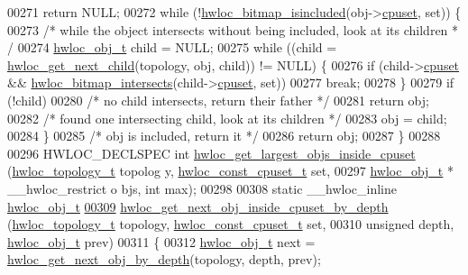 \begin{DoxyCode}
00271     \textcolor{keywordflow}{return} NULL;
00272   \textcolor{keywordflow}{while} (!\hyperlink{a00065_gaae29e14a926c198e8f91e6e4790621e7}{hwloc_bitmap_isincluded}(obj->\hyperlink{a00016_a67925e0f2c47f50408fbdb9bddd0790f}{cpuset}, \textcolor{keyword}{set})) \{
00273     \textcolor{comment}{/* while the object intersects without being included, look at its children *
      /}
00274     \hyperlink{a00016}{hwloc_obj_t} child = NULL;
00275     \textcolor{keywordflow}{while} ((child = \hyperlink{a00053_gae5ef1af636849f77714e1584ba78cf9c}{hwloc_get_next_child}(topology, obj, child)) != NULL) \{
00276       \textcolor{keywordflow}{if} (child->\hyperlink{a00016_a67925e0f2c47f50408fbdb9bddd0790f}{cpuset} && \hyperlink{a00065_ga575c27953709a8cb9a047aae65157526}{hwloc_bitmap_intersects}(child->\hyperlink{a00016_a67925e0f2c47f50408fbdb9bddd0790f}{cpuset}, \textcolor{keyword}{set}))
00277         \textcolor{keywordflow}{break};
00278     \}
00279     \textcolor{keywordflow}{if} (!child)
00280       \textcolor{comment}{/* no child intersects, return their father */}
00281       \textcolor{keywordflow}{return} obj;
00282     \textcolor{comment}{/* found one intersecting child, look at its children */}
00283     obj = child;
00284   \}
00285   \textcolor{comment}{/* obj is included, return it */}
00286   \textcolor{keywordflow}{return} obj;
00287 \}
00288 
00296 HWLOC\_DECLSPEC \textcolor{keywordtype}{int} \hyperlink{a00054_gaab04c89623662e63a48ed2cd48eb601c}{hwloc_get_largest_objs_inside_cpuset} (\hyperlink{a00039_ga9d1e76ee15a7dee158b786c30b6a6e38}{hwloc_topology_t} topolog
      y, \hyperlink{a00040_ga1f784433e9b606261f62d1134f6a3b25}{hwloc_const_cpuset_t} \textcolor{keyword}{set},
00297                                                  \hyperlink{a00016}{hwloc_obj_t} * \_\_hwloc\_restrict o
      bjs, \textcolor{keywordtype}{int} max);
00298 
00308 \textcolor{keyword}{static} \_\_hwloc\_inline \hyperlink{a00016}{hwloc_obj_t}
\hypertarget{a00031_source_l00309}{}\hyperlink{a00054_ga8af256c2572f16520f95440b884c1bd6}{00309} \hyperlink{a00054_ga8af256c2572f16520f95440b884c1bd6}{hwloc_get_next_obj_inside_cpuset_by_depth} (\hyperlink{a00039_ga9d1e76ee15a7dee158b786c30b6a6e38}{hwloc_topology_t} topology, 
      \hyperlink{a00040_ga1f784433e9b606261f62d1134f6a3b25}{hwloc_const_cpuset_t} \textcolor{keyword}{set},
00310                                            \textcolor{keywordtype}{unsigned} depth, \hyperlink{a00016}{hwloc_obj_t} prev)
00311 \{
00312   \hyperlink{a00016}{hwloc_obj_t} next = \hyperlink{a00053_gab7c1dce3f42ece5bfa621e87cf332418}{hwloc_get_next_obj_by_depth}(topology, depth, prev);

\end{DoxyCode}
